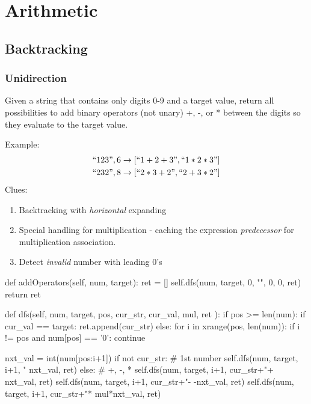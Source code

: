 \chapter{Arithmetic}
\section{Backtracking}
\subsection{Unidirection}
 Given a string that contains only digits 0-9 and a target value, return all possibilities to add binary operators (not unary) +, -, or * between the digits so they evaluate to the target value.

Example: 
\begin{align*}
``123", 6 \rightarrow [``1+2+3", ``1*2*3"] \\ 
``232", 8 \rightarrow [``2*3+2", ``2+3*2"] \\
\end{align*}
Clues:
\begin{enumerate}
\item Backtracking with \textit{horizontal} expanding
\item Special handling for multiplication - caching the expression \textit{predecessor} for multiplication association. 
\item Detect \textit{invalid} number with leading 0's
\end{enumerate}

\begin{python}
def addOperators(self, num, target):
  ret = []
  self.dfs(num, target, 0, "", 0, 0, ret)
  return ret

def dfs(self, num, target, pos, 
        cur_str, cur_val, 
        mul, ret
):
  if pos >= len(num):
    if cur_val == target:
      ret.append(cur_str)
  else:
    for i in xrange(pos, len(num)):
      if i != pos and num[pos] == '0':
        continue
        
      nxt_val = int(num[pos:i+1])
      if not cur_str:  # 1st number
        self.dfs(num, target, i+1, 
            "%
            nxt_val, ret)
      else:  # +, -, *
        self.dfs(num, target, i+1, 
            cur_str+"+%
            nxt_val, ret)
        self.dfs(num, target, i+1, 
            cur_str+"-%
            -nxt_val, ret)
        self.dfs(num, target, i+1, 
    cur_str+"*%
            mul*nxt_val, ret)
\end{python}
